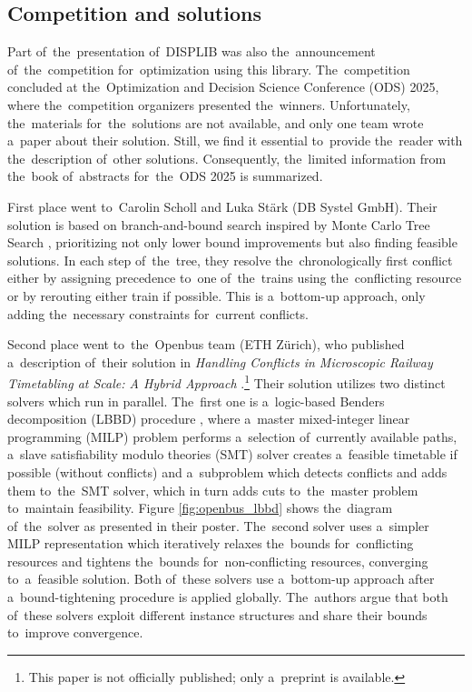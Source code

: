 \subsection{Competition and solutions}
Part of~the~presentation of~DISPLIB was also the~announcement of~the~competition for~optimization using this library. The~competition concluded at the~Optimization and Decision Science Conference (ODS) 2025, where the~competition organizers presented the~winners. Unfortunately, the~materials for~the~solutions are not available, and only one team wrote a~paper about their solution. Still, we find it essential to~provide the~reader with the~description of~other solutions. Consequently, the~limited information from the~book of~abstracts for~the~ODS 2025 \cite{ods2025bookofabstracts} is summarized.

First place went to~Carolin Scholl and Luka Stärk (DB Systel GmbH). Their solution is based on branch-and-bound search inspired by Monte Carlo Tree Search \cite{DARIANO2007643}, prioritizing not only lower bound improvements but also finding feasible solutions. In each step of~the~tree, they resolve the~chronologically first conflict either by assigning precedence to~one of~the~trains using the~conflicting resource or by rerouting either train if possible. This is a~bottom-up approach, only adding the~necessary constraints for~current conflicts.

Second place went to~the~Openbus team (ETH Zürich), who published a~description of~their solution in \emph{Handling Conflicts in Microscopic Railway Timetabling at Scale: A Hybrid Approach} \cite{Dubach2025handling}.\footnote{This paper is not officially published; only a~preprint is available.} Their solution utilizes two distinct solvers which run in parallel. The~first one is a~logic-based Benders decomposition (LBBD) procedure \cite{Leutwiler2022logic}, where a~master mixed-integer linear programming (MILP) problem performs a~selection of~currently available paths, a~slave satisfiability modulo theories (SMT) solver creates a~feasible timetable if possible (without conflicts) and a~subproblem which detects conflicts and adds them to~the~SMT solver, which in turn adds cuts to~the~master problem to~maintain feasibility. Figure \ref{fig:openbus_lbbd} shows the~diagram of~the~solver as presented in their poster. The~second solver uses a~simpler MILP representation which iteratively relaxes the~bounds for~conflicting resources and tightens the~bounds for~non-conflicting resources, converging to~a~feasible solution. Both of~these solvers use a~bottom-up approach after a~bound-tightening procedure is applied globally. The~authors argue that both of~these solvers exploit different instance structures and share their bounds to~improve convergence.

